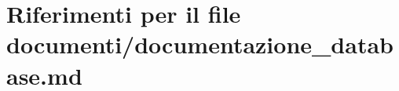 \hypertarget{documentazione__database_8md}{}\section{Riferimenti per il file documenti/documentazione\+\_\+database.md}
\label{documentazione__database_8md}
